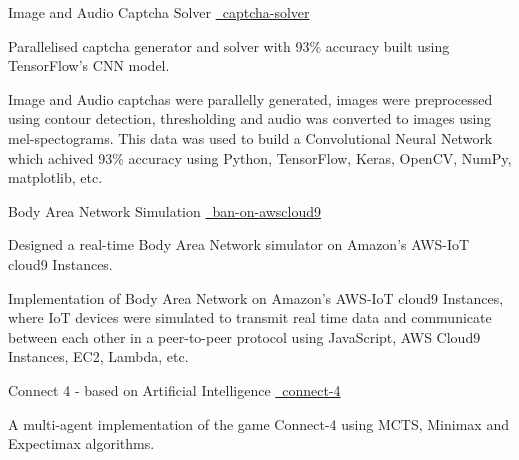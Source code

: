 \begin{cventries}
   \cvproject
    {Image and Audio Captcha Solver}
    {
    {}
    {\href{https://github.com/mukeshmk/image-audio-captcha}
    {\faGithubSquare\ captcha-solver}}
    }
    {}
    {
      \begin{cvitems}
      \vspace{-0.5ex}
        {
        \item {Parallelised captcha generator and solver with 93\% accuracy built using TensorFlow’s CNN model.}
        }
        {
        Image and Audio captchas were parallelly generated, images were preprocessed using contour detection, thresholding and audio was converted to images using mel-spectograms. This data was used to build a Convolutional Neural Network which achived 93\% accuracy using Python, TensorFlow, Keras, OpenCV, NumPy, matplotlib, etc.
        }
      \end{cvitems}
    }
  \cvproject
    {Body Area Network Simulation}
    {
    {}
    {\href{https://github.com/mukeshmk/ban-on-awscloud9}{\faGithubSquare\ ban-on-awscloud9}}
    }
    {}
    {
       \begin{cvitems}
       \vspace{-0.5ex}
        {
        \item{Designed a real-time Body Area Network simulator on Amazon's AWS-IoT cloud9 Instances.}
        }
        {
        Implementation of Body Area Network on Amazon's AWS-IoT cloud9 Instances, where IoT devices were simulated to transmit real time data and communicate between each other in a peer-to-peer protocol using JavaScript, AWS Cloud9 Instances, EC2, Lambda, etc.
        }
      \end{cvitems}
    }
  \cvproject
    {Connect 4 - based on Artificial Intelligence}
    {
    {}
    {\href{https://github.com/mukeshmk/connect-4}{\faGithubSquare\ connect-4}}
    }
    {}
    {
      \begin{cvitems}
      \vspace{-0.5ex}
      {
      \item {A multi-agent implementation of the game Connect-4 using MCTS, Minimax and Expectimax algorithms.} 
}
\end{cvitems}}
\end{cventries}
